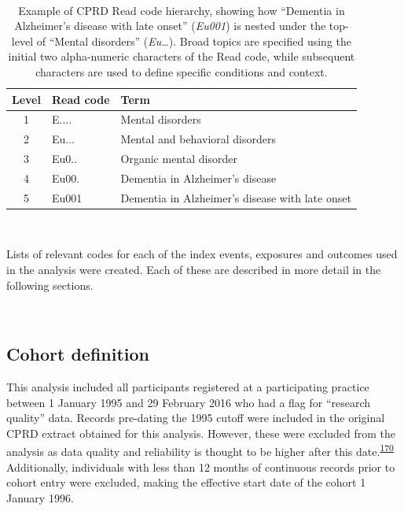 \documentclass[a4paper, twoside]{templates/ociamthesis}
\begin{document}
~





\begin{table}[H]

\caption[Example of CPRD Read code hierarchy]{\label{tab:readExample-table}Example of CPRD Read code hierarchy, showing how ``Dementia in Alzheimer's disease with late onset'' (\emph{Eu001}) is nested under the top-level of ``Mental disorders'' (\emph{Eu\ldots{}}). Broad topics are specified using the initial two alpha-numeric characters of the Read code, while subsequent characters are used to define specific conditions and context.}
\centering
\begin{tabular}[t]{cll}
\toprule
\textbf{Level} & \textbf{Read code} & \textbf{Term}\\
\midrule
1 & E.... & Mental disorders\\
2 & Eu... & Mental and behavioral disorders\\
3 & Eu0.. & Organic mental disorder\\
4 & Eu00. & Dementia in Alzheimer's disease\\
5 & Eu001 & Dementia in Alzheimer's disease with late onset\\
\bottomrule
\end{tabular}
\end{table}

~

Lists of relevant codes for each of the index events, exposures and outcomes used in the analysis were created. Each of these are described in more detail in the following sections.

~

\hypertarget{cohort-definition}{%
\subsection{Cohort definition}\label{cohort-definition}}

This analysis included all participants registered at a participating practice between 1 January 1995 and 29 February 2016 who had a flag for ``research quality'' data. Records pre-dating the 1995 cutoff were included in the original CPRD extract obtained for this analysis. However, these were excluded from the analysis as data quality and reliability is thought to be higher after this date.\textsuperscript{\protect\hyperlink{ref-wolf2019}{170}} Additionally, individuals with less than 12 months of continuous records prior to cohort entry were excluded, making the effective start date of the cohort 1 January 1996.
\end{document}
